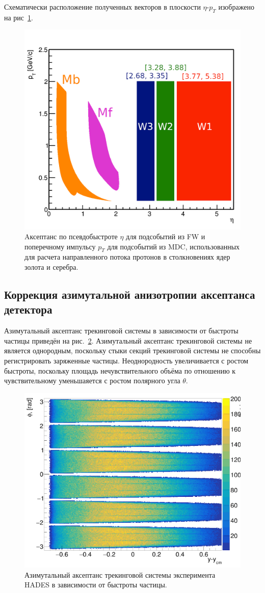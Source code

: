 Схематически расположение полученных векторов в плоскости $\eta$-$p_T$ изображено на рис~\ref{fig:hades_qvectors}.
%
\begin{figure}[ht]
\begin{center}
\includegraphics[width=0.75\linewidth]{images/eta_pt_qvectors.png}
\caption{Aксептанс по псевдобыстроте $\eta$ для подсобытий из FW и поперечному импульсу $p_T$ для подсобытий из MDC, использованных для расчета направленного потока протонов в столкновениях ядер золота и серебра.}
\label{fig:hades_qvectors}
\end{center}
\end{figure}
%

\subsection{Коррекция азимутальной анизотропии аксептанса детектора}

Азимутальный аксептанс трекинговой системы в зависимости от быстроты частицы приведён на рис.~\ref{fig:hades_phi_y}.
Азимутальный аксептанс трекинговой системы не является однородным, поскольку стыки секций трекинговой системы не способны регистрировать заряженные частицы.
Неоднородность увеличивается с ростом быстроты, поскольку площадь нечувствительного объёма по отношению к чувствительному уменьшаяется с ростом полярного угла $\theta$. 
%
\begin{figure}[ht]
\begin{center}
\includegraphics[width=0.55\linewidth]{images/hades_phi_y.png}
\caption{Азимутальный аксептанс трекинговой системы эксперимента HADES в зависимости от быстроты частицы.}
\label{fig:hades_phi_y}
\end{center}
\end{figure}

